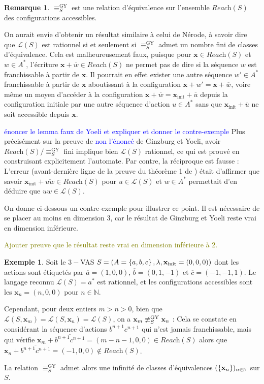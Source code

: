 \documentclass[a4paper,final]{article}
\theoremstyle{definition}
\newtheorem{Example}[Theorem]{Exemple}
\newtheorem*{Remark}{Remarque}
\newcommand{\alain}[1]{\textcolor{blue}{#1}}
\newcommand{\lucas}[1]{\textcolor{olive}{#1}}
\newcommand{\os}[1]{\left\{\mathinner{#1}\right\}}
\newcommand{\N}{\ensuremath{\mathbb{N}}}
\newcommand{\lang}{\ensuremath{\mathcal{L}}}
\newcommand{\reach}{\ensuremath{\textit{Reach}}}
\newcommand{\vect}[1]{\ensuremath{\mathbf{#1}}}
\newcommand{\relGY}{\ensuremath{\equiv^\text{GY}_S}}
\newcommand{\xinit}{\ensuremath{\vect{x}_\text{init}}}
\newcommand{\valeur}[1]{\ensuremath{\overline{#1}}}
\begin{document}
\begin{Remark}
$\relGY$ est une relation d'équivalence sur l'ensemble $\reach(S)$ des configurations accessibles.
\end{Remark}

On aurait envie d'obtenir un résultat similaire à celui de Nérode, à savoir dire que $\lang(S)$ est rationnel si et seulement si $\relGY$ admet un nombre fini de classes d'équivalence.
Cela est malheureusement faux, puisque pour $\vect{x}\in\reach(S)$ et $w\in A^\ast$, l'écriture $\vect{x} +\valeur{w}\in\reach(S)$ ne permet pas de dire si la séquence $w$ est franchissable à partir de $\vect{x}$.
Il pourrait en effet exister une autre séquence $w'\in A^\ast$ franchissable à partir de $\vect{x}$ aboutissant à la configuration $\vect{x} +\valeur{w'} = \vect{x} +\valeur{w}$,
voire même un moyen d'accéder à la configuration $\vect{x} +\valeur{w} = \xinit +\valeur{u}$ depuis la configuration initiale par une autre séquence d'action $u\in A^\ast$ sans que $\xinit +\valeur{u}$ ne soit accessible depuis $\vect{x}$.

\alain{énoncer le lemma faux de Yoeli et expliquer et donner le contre-exemple}
Plus précisément sur la preuve de \alain{non l'énoncé } de Ginzburg et Yoeli, 
avoir $\reach(S)/\relGY$ fini implique bien $\lang(S)$ rationnel, ce qui est prouvé en construisant explicitement l'automate.
Par contre, la réciproque est fausse : 
L'erreur (avant-dernière ligne de la preuve du théorème 1 de \cite{giyo80}) était d'affirmer que savoir $\xinit +\valeur{uw}\in\reach(S)$ pour $u\in\lang(S)$ et $w\in A^\ast$ permettait d'en déduire que $uw\in\lang(S)$.

\vspace{5mm}

On donne ci-dessous un contre-exemple pour illustrer ce point.
Il est nécessaire de se placer au moins en dimension 3, car le résultat de Ginzburg et Yoeli reste vrai en dimension inférieure.

\lucas{Ajouter preuve que le résultat reste vrai en dimension inférieure à 2.}

\begin{Example}
Soit le $3-$VAS $S = (A=\os{a,b,c}, \lambda, \xinit=(0,0,0))$ dont les actions sont étiquetés par $\valeur{a}=(1,0,0)$, $\valeur{b}=(0,1,-1)$ et $\valeur{c}=(-1,-1,1)$.
Le langage reconnu $\lang(S)=a^\ast$ est rationnel, et les configurations accessibles sont les $\vect{x}_n=(n,0,0)$ pour $n\in\N$.

Cependant, pour deux entiers $m>n>0$, bien que $\lang(S,\vect{x}_m) =\lang(S,\vect{x}_n) =\lang(S)$, on a $\vect{x}_m \not\relGY \vect{x}_n$ :
Cela se constate en considérant la séquence d'actions $b^{n+1}c^{n+1}$ qui n'est jamais franchissable, mais qui vérifie $\vect{x}_m +\valeur{b^{n+1}c^{n+1}} = (m-n-1,0,0)\in \reach(S)$ alors que $\vect{x}_n +\valeur{b^{n+1}c^{n+1}} = (-1,0,0)\notin \reach(S)$.

La relation $\relGY$ admet alors une infinité de classes d'équivalences $(\os{\vect{x}_n})_{n\in\N}$ sur $S$.
\end{Example}
\end{document}
